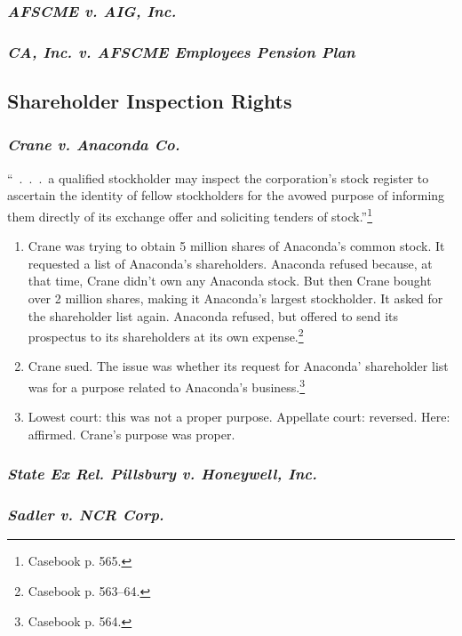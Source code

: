 
\subsubsection{\emph{AFSCME v. AIG, Inc.}}


\subsubsection{\emph{CA, Inc. v. AFSCME Employees Pension Plan}}


\subsection{Shareholder Inspection Rights}


\subsubsection{\emph{Crane v. Anaconda Co.}}

``~.~.~.~a qualified stockholder may inspect the corporation's stock register to 
ascertain the identity of fellow stockholders for the avowed purpose of 
informing them directly of its exchange offer and soliciting tenders of 
stock.''\footnote{Casebook p. 565.}

\begin{enumerate}
    \item Crane was trying to obtain 5 million shares of Anaconda's common 
    stock. It requested a list of Anaconda's shareholders. Anaconda refused 
    because, at that time, Crane didn't own any Anaconda stock. But then Crane 
    bought over 2 million shares, making it Anaconda's largest stockholder. It 
    asked for the shareholder list again. Anaconda refused, but offered to send 
    its prospectus to its shareholders at its own expense.\footnote{Casebook p. 
    563--64.}
    \item Crane sued. The issue was whether its request for Anaconda' 
    shareholder list was for a purpose related to Anaconda's 
    business.\footnote{Casebook p. 564.}
    \item Lowest court: this was not a proper purpose. Appellate court: 
    reversed. Here: affirmed. Crane's purpose was proper.
\end{enumerate}

\subsubsection{\emph{State Ex Rel. Pillsbury v. Honeywell, Inc.}}


\subsubsection{\emph{Sadler v. NCR Corp.}}

